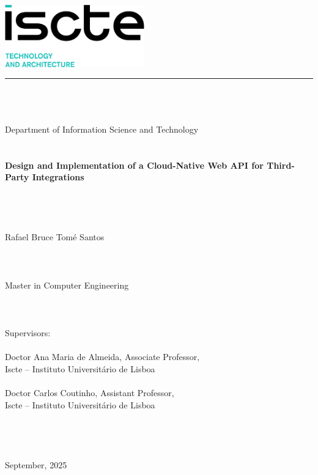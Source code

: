 \documentclass[12pt, reqno]{amsbook}
\theoremstyle{definition}
\theoremstyle{definition}
\numberwithin{section}{chapter}
\numberwithin{table}{chapter}
\numberwithin{figure}{chapter}
\begin{document}
\begin{flushleft}
  \includegraphics[width=6.03cm]{images/ista}\\[7mm]
  \textcolor{MyDarkBlue}{\rule {14.9cm} {1pt}}
  ~\\
  ~\\
  ~\\
  Department of Information Science and Technology\\
  ~\\
  ~\\
  \textbf{Design and Implementation of a Cloud-Native Web API for Third-Party Integrations}\\
  ~\\
  ~\\
  ~\\
  ~\\
  Rafael Bruce Tomé Santos\\
  ~\\
  ~\\
  ~\\
  Master in Computer Engineering\\
  ~\\
  ~\\
  ~\\
  Supervisors:\\
  ~\\
  Doctor Ana Maria de Almeida, Associate Professor,\\
  Iscte -- Instituto Universitário de Lisboa\\
  ~\\
  Doctor Carlos Coutinho, Assistant Professor,\\
  Iscte -- Instituto Universitário de Lisboa\\
  ~\\
  ~\\
  ~\\
  ~\\
  September, 2025
\end{flushleft}
\thispagestyle{empty}
\rmfamily
\normalsize
\frontmatter
\thispagestyle{empty}

\frontmatter
{}
\thispagestyle{empty}

\setcounter{page}{1}
\end{document}
